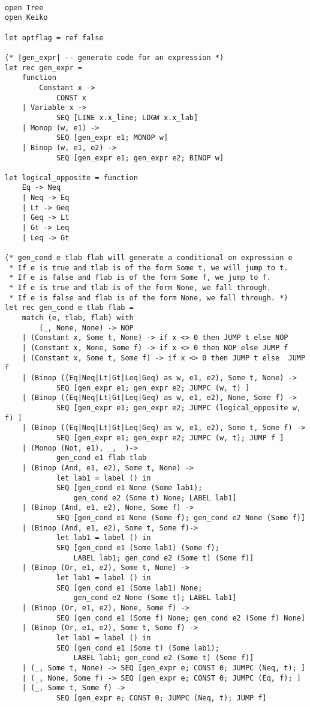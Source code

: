 \begin{lstlisting}[language=Ml]

open Tree
open Keiko

let optflag = ref false

(* |gen_expr| -- generate code for an expression *)
let rec gen_expr =
    function
        Constant x ->
            CONST x
    | Variable x ->
            SEQ [LINE x.x_line; LDGW x.x_lab]
    | Monop (w, e1) ->
            SEQ [gen_expr e1; MONOP w]
    | Binop (w, e1, e2) ->
            SEQ [gen_expr e1; gen_expr e2; BINOP w]

let logical_opposite = function
    Eq -> Neq
    | Neq -> Eq
    | Lt -> Geq
    | Geq -> Lt
    | Gt -> Leq
    | Leq -> Gt

(* gen_cond e tlab flab will generate a conditional on expression e
 * If e is true and tlab is of the form Some t, we will jump to t.
 * If e is false and flab is of the form Some f, we jump to f.
 * If e is true and tlab is of the form None, we fall through.
 * If e is false and flab is of the form None, we fall through. *)
let rec gen_cond e tlab flab =
    match (e, tlab, flab) with
        (_, None, None) -> NOP
    | (Constant x, Some t, None) -> if x <> 0 then JUMP t else NOP
    | (Constant x, None, Some f) -> if x <> 0 then NOP else JUMP f
    | (Constant x, Some t, Some f) -> if x <> 0 then JUMP t else  JUMP f
    | (Binop ((Eq|Neq|Lt|Gt|Leq|Geq) as w, e1, e2), Some t, None) -> 
            SEQ [gen_expr e1; gen_expr e2; JUMPC (w, t) ]
    | (Binop ((Eq|Neq|Lt|Gt|Leq|Geq) as w, e1, e2), None, Some f) -> 
            SEQ [gen_expr e1; gen_expr e2; JUMPC (logical_opposite w, f) ]
    | (Binop ((Eq|Neq|Lt|Gt|Leq|Geq) as w, e1, e2), Some t, Some f) -> 
            SEQ [gen_expr e1; gen_expr e2; JUMPC (w, t); JUMP f ]
    | (Monop (Not, e1), _, _)->
            gen_cond e1 flab tlab
    | (Binop (And, e1, e2), Some t, None) ->
            let lab1 = label () in
            SEQ [gen_cond e1 None (Some lab1);
                gen_cond e2 (Some t) None; LABEL lab1]
    | (Binop (And, e1, e2), None, Some f) ->
            SEQ [gen_cond e1 None (Some f); gen_cond e2 None (Some f)]
    | (Binop (And, e1, e2), Some t, Some f)->
            let lab1 = label () in
            SEQ [gen_cond e1 (Some lab1) (Some f);
                LABEL lab1; gen_cond e2 (Some t) (Some f)]
    | (Binop (Or, e1, e2), Some t, None) ->
            let lab1 = label () in
            SEQ [gen_cond e1 (Some lab1) None;
                gen_cond e2 None (Some t); LABEL lab1]
    | (Binop (Or, e1, e2), None, Some f) ->
            SEQ [gen_cond e1 (Some f) None; gen_cond e2 (Some f) None]
    | (Binop (Or, e1, e2), Some t, Some f) ->
            let lab1 = label () in
            SEQ [gen_cond e1 (Some t) (Some lab1);
                LABEL lab1; gen_cond e2 (Some t) (Some f)]
    | (_, Some t, None) -> SEQ [gen_expr e; CONST 0; JUMPC (Neq, t); ]
    | (_, None, Some f) -> SEQ [gen_expr e; CONST 0; JUMPC (Eq, f); ]
    | (_, Some t, Some f) ->
            SEQ [gen_expr e; CONST 0; JUMPC (Neq, t); JUMP f]



\end{lstlisting}
